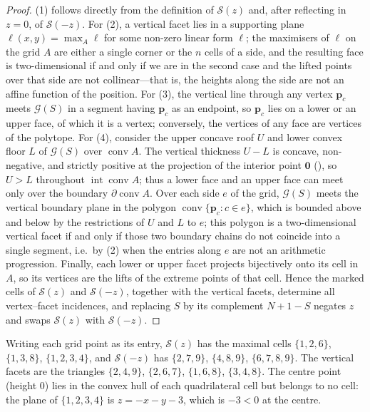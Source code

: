 \begin{proof}
(1) follows directly from the definition of $\mathcal S(z)$ and, after reflecting in $z=0$, of $\mathcal S(-z)$.
For (2), a vertical facet lies in a supporting plane $\ell(x,y)=\max_A\ell$ for some non-zero linear form $\ell$; the maximisers of $\ell$ on the grid $A$ are either a single corner or the $n$ cells of a side, and the resulting face is two-dimensional if and only if we are in the second case and the lifted points over that side are not collinear—that is, the heights along the side are not an affine function of the position.
For (3), the vertical line through any vertex $\mathbf p_c$ meets $\mathcal G(S)$ in a segment having $\mathbf p_c$ as an endpoint, so $\mathbf p_c$ lies on a lower or an upper face, of which it is a vertex; conversely, the vertices of any face are vertices of the polytope.
For (4), consider the upper concave roof $U$ and lower convex floor $L$ of $\mathcal G(S)$ over $\operatorname{conv}A$.
The vertical thickness $U-L$ is concave, non-negative, and strictly positive at the projection of the interior point $\mathbf 0$ (), so $U>L$ throughout $\operatorname{int}\operatorname{conv}A$; thus a lower face and an upper face can meet only over the boundary $\partial\operatorname{conv}A$.
Over each side $e$ of the grid, $\mathcal G(S)$ meets the vertical boundary plane in the polygon $\operatorname{conv}\{\mathbf p_c: c\in e\}$, which is bounded above and below by the restrictions of $U$ and $L$ to $e$; this polygon is a two-dimensional vertical facet if and only if those two boundary chains do not coincide into a single segment, i.e.\ by (2) when the entries along $e$ are not an arithmetic progression.
Finally, each lower or upper facet projects bijectively onto its cell in $A$, so its vertices are the lifts of the extreme points of that cell.
Hence the marked cells of $\mathcal S(z)$ and $\mathcal S(-z)$, together with the vertical facets, determine all vertex--facet incidences, and replacing $S$ by its complement $N+1-S$ negates $z$ and swaps $\mathcal S(z)$ with $\mathcal S(-z)$.
\end{proof}

\begin{example}
\label{ex:loshu-subdiv}
Writing each grid point as its entry, $\mathcal S(z)$ has the maximal cells $\{1,2,6\}$, $\{1,3,8\}$, $\{1,2,3,4\}$, and $\mathcal S(-z)$ has $\{2,7,9\}$, $\{4,8,9\}$, $\{6,7,8,9\}$.
The vertical facets are the triangles $\{2,4,9\}$, $\{2,6,7\}$, $\{1,6,8\}$, $\{3,4,8\}$.
The centre point (height $0$) lies in the convex hull of each quadrilateral cell but belongs to no cell: the plane of $\{1,2,3,4\}$ is $z=-x-y-3$, which is $-3<0$ at the centre.
\end{example}

